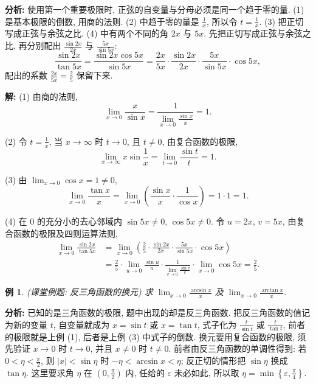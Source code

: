 \documentclass[UTF8,openany]{ctexbook}
\theoremstyle{chinesetextbook}
\newtheorem{example}{例}[section]
\newenvironment{cnsolution}{\par\indent\textbf{解:} \ignorespaces}{\par}
\begin{document}
\par\indent\textbf{分析:} 使用第一个重要极限时, 正弦的自变量与分母必须是同一个趋于零的量. (1) 是基本极限的倒数, 用商的法则. (2) 中趋于零的量是 $\displaystyle\frac1x$, 所以令 $\displaystyle t=\frac1x$. (3) 把正切写成正弦与余弦之比. (4) 中有两个不同的角 $2x$ 与 $5x$. 先把正切写成正弦与余弦之比, 再分别配出 $\displaystyle\frac{\sin2x}{2x}$ 与 $\displaystyle\frac{5x}{\sin5x}$:
\[
\frac{\sin2x}{\tan5x}=\frac{\sin2x\cos5x}{\sin5x}=\frac{2x}{5x}\cdot\frac{\sin2x}{2x}\cdot\frac{5x}{\sin5x}\cdot\cos5x,
\]
配出的系数 $\displaystyle\frac{2x}{5x}=\frac25$ 保留下来.
\begin{cnsolution}
(1) 由商的法则,
\[
\lim_{x\to0}\frac x{\sin x}=\frac1{\displaystyle\lim_{x\to0}\frac{\sin x}x}=1.
\]

(2) 令 $\displaystyle t=\frac1x$, 当 $x\to\infty$ 时 $t\to0$, 且 $t\ne0$, 由复合函数的极限,
\[
\lim_{x\to\infty}x\sin\frac1x=\lim_{t\to0}\frac{\sin t}t=1.
\]

(3) 由 $\displaystyle\lim_{x\to0}\cos x=1\ne0$,
\[
\lim_{x\to0}\frac{\tan x}x=\lim_{x\to0}\left(\frac{\sin x}x\cdot\frac1{\cos x}\right)=1\cdot1=1.
\]

(4) 在 $0$ 的充分小的去心邻域内 $\sin5x\ne0$, $\cos5x\ne0$. 令 $u=2x$, $v=5x$, 由复合函数的极限及四则运算法则,
\[
\begin{aligned}
\lim_{x\to0}\frac{\sin2x}{\tan5x}
&=\lim_{x\to0}\left(\frac25\cdot\frac{\sin2x}{2x}\cdot\frac{5x}{\sin5x}\cdot\cos5x\right)\\
&=\frac25\cdot\lim_{u\to0}\frac{\sin u}u\cdot\frac1{\displaystyle\lim_{v\to0}\frac{\sin v}v}\cdot\lim_{x\to0}\cos5x=\frac25.
\end{aligned}
\]
\end{cnsolution}
\begin{example}
\textnormal{(课堂例题: 反三角函数的换元)} 求 $\displaystyle\lim_{x\to0}\frac{\arcsin x}x$ 及 $\displaystyle\lim_{x\to0}\frac{\arctan x}x$.
\end{example}
\par\indent\textbf{分析:} 已知的是三角函数的极限, 题中出现的却是反三角函数. 把反三角函数的值记为新的变量 $t$, 自变量就成为 $x=\sin t$ 或 $x=\tan t$, 式子化为 $\displaystyle\frac t{\sin t}$ 或 $\displaystyle\frac t{\tan t}$, 前者的极限就是上例 (1), 后者是上例 (3) 中式子的倒数. 换元要用复合函数的极限, 须先验证 $x\to0$ 时 $t\to0$, 并且 $x\ne0$ 时 $t\ne0$. 前者由反三角函数的单调性得到: 若 $\displaystyle0<\eta<\frac\pi2$, 则 $|x|<\sin\eta$ 时 $-\eta<\arcsin x<\eta$; 反正切的情形把 $\sin\eta$ 换成 $\tan\eta$. 这里要求角 $\eta$ 在 $\displaystyle\left(0,\frac\pi2\right)$ 内, 任给的 $\varepsilon$ 未必如此, 所以取 $\displaystyle\eta=\min\left\{\varepsilon,\frac\pi4\right\}$.
\end{document}
